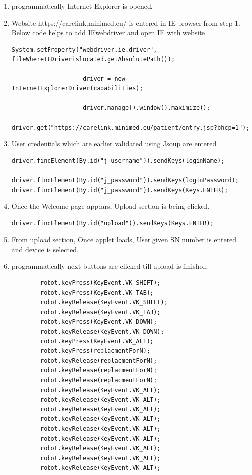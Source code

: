 \documentclass[article,type=msc,colorback,accentcolor=tud9c,twoside,11pt]{tudthesis}
\begin{document}
\begin{enumerate}
\item programmatically Internet Explorer is opened.
\item Website https://carelink.minimed.eu/ is entered in  IE browser from step 1. Below code helps to add IEwebdriver and open IE with website 
\begin{lstlisting}
System.setProperty("webdriver.ie.driver", fileWhereIEDriverislocated.getAbsolutePath());

					driver = new InternetExplorerDriver(capabilities);

					driver.manage().window().maximize();
					driver.get("https://carelink.minimed.eu/patient/entry.jsp?bhcp=1");
\end{lstlisting}

\item User credentials which are earlier validated using Jsoup are entered
\begin{lstlisting}
driver.findElement(By.id("j_username")).sendKeys(loginName);
				driver.findElement(By.id("j_password")).sendKeys(loginPassword);
driver.findElement(By.id("j_password")).sendKeys(Keys.ENTER);
\end{lstlisting}
\item Once the Welcome page appears, Upload section is being clicked.
\begin{lstlisting}
driver.findElement(By.id("upload")).sendKeys(Keys.ENTER);
\end{lstlisting}
\item From upload section, Once applet loads, User given SN number is entered and device is selected.
\item programmatically next buttons are clicked till upload is finished.
\begin{lstlisting}
		robot.keyPress(KeyEvent.VK_SHIFT);
		robot.keyPress(KeyEvent.VK_TAB);
		robot.keyRelease(KeyEvent.VK_SHIFT);
		robot.keyRelease(KeyEvent.VK_TAB);
		robot.keyPress(KeyEvent.VK_DOWN);
		robot.keyRelease(KeyEvent.VK_DOWN);
		robot.keyPress(KeyEvent.VK_ALT);
		robot.keyPress(replacmentForN);
		robot.keyRelease(replacmentForN);
		robot.keyRelease(replacmentForN);
		robot.keyRelease(replacmentForN);
		robot.keyRelease(KeyEvent.VK_ALT);
		robot.keyRelease(KeyEvent.VK_ALT);
		robot.keyRelease(KeyEvent.VK_ALT);
		robot.keyRelease(KeyEvent.VK_ALT);
		robot.keyRelease(KeyEvent.VK_ALT);
		robot.keyRelease(KeyEvent.VK_ALT);
		robot.keyRelease(KeyEvent.VK_ALT);
		robot.keyRelease(KeyEvent.VK_ALT);
		robot.keyRelease(KeyEvent.VK_ALT);
\end{lstlisting}
\end{enumerate}
\end{document}
